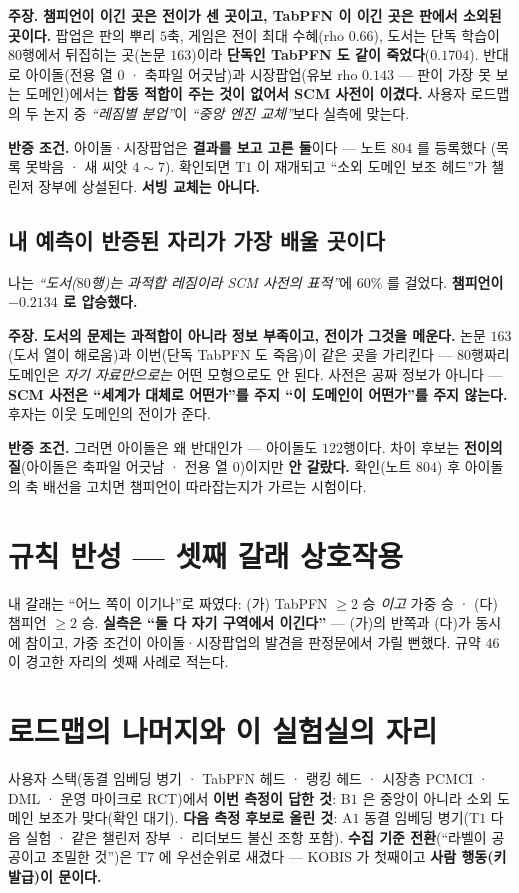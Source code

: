\documentclass[10pt,a4paper]{article}
\newcommand{\claim}[2]{\begin{claimbox}\textbf{주장.} #1\par\smallskip
  \textcolor{gray!70}{\textbf{반증 조건.} #2}\end{claimbox}}
\begin{document}
\claim{\textbf{챔피언이 이긴 곳은 전이가 센 곳이고, TabPFN 이 이긴 곳은 판에서
소외된 곳이다.} 팝업은 판의 뿌리 $5$축, 게임은 전이 최대 수혜(rho $0.66$), 도서는
단독 학습이 $80$행에서 뒤집히는 곳(논문 $163$)이라 \textbf{단독인 TabPFN 도 같이
죽었다}($0.1704$). 반대로 아이돌(전용 열 $0$ · 축파일 어긋남)과 시장팝업(유보
rho $0.143$ --- 판이 가장 못 보는 도메인)에서는 \textbf{합동 적합이 주는 것이
없어서 SCM 사전이 이겼다.} 사용자 로드맵의 두 논지 중 \emph{``레짐별 분업''}이
\emph{``중앙 엔진 교체''}보다 실측에 맞는다.}
{아이돌·시장팝업은 \textbf{결과를 보고 고른 둘}이다 --- 노트 $804$ 를 등록했다
(목록 못박음 · 새 씨앗 $4{\sim}7$). 확인되면 T$1$ 이 재개되고 ``소외 도메인 보조
헤드''가 챌린저 장부에 상설된다. \textbf{서빙 교체는 아니다.}}

\subsection*{내 예측이 반증된 자리가 가장 배울 곳이다}

나는 \emph{``도서($80$행)는 과적합 레짐이라 SCM 사전의 표적''}에 $60\%$ 를 걸었다.
\textbf{챔피언이 $-0.2134$ 로 압승했다.}

\claim{\textbf{도서의 문제는 과적합이 아니라 정보 부족이고, 전이가 그것을 메운다.}
논문 $163$(도서 열이 해로움)과 이번(단독 TabPFN 도 죽음)이 같은 곳을 가리킨다 ---
$80$행짜리 도메인은 \emph{자기 자료만으로는} 어떤 모형으로도 안 된다. 사전은
공짜 정보가 아니다 --- \textbf{SCM 사전은 ``세계가 대체로 어떤가''를 주지 ``이
도메인이 어떤가''를 주지 않는다.} 후자는 이웃 도메인의 전이가 준다.}
{그러면 아이돌은 왜 반대인가 --- 아이돌도 $122$행이다. 차이 후보는 \textbf{전이의
질}(아이돌은 축파일 어긋남 · 전용 열 $0$)이지만 \textbf{안 갈랐다.} 확인(노트
$804$) 후 아이돌의 축 배선을 고치면 챔피언이 따라잡는지가 가르는 시험이다.}

\section{규칙 반성 --- 셋째 갈래 상호작용}

내 갈래는 ``어느 쪽이 이기나''로 짜였다: (가) TabPFN $\geq 2$ 승 \emph{이고}
가중 승 · (다) 챔피언 $\geq 2$ 승. \textbf{실측은 ``둘 다 자기 구역에서 이긴다''}
--- (가)의 반쪽과 (다)가 동시에 참이고, 가중 조건이 아이돌·시장팝업의 발견을
판정문에서 가릴 뻔했다. 규약 $46$ 이 경고한 자리의 셋째 사례로 적는다.

\section{로드맵의 나머지와 이 실험실의 자리}

사용자 스택(동결 임베딩 병기 · TabPFN 헤드 · 랭킹 헤드 · 시장층 PCMCI · DML ·
운영 마이크로 RCT)에서 \textbf{이번 측정이 답한 것}: B$1$ 은 중앙이 아니라 소외
도메인 보조가 맞다(확인 대기). \textbf{다음 측정 후보로 올린 것}: A$1$ 동결 임베딩
병기(T$1$ 다음 실험 · 같은 챌린저 장부 · 리더보드 불신 조항 포함). \textbf{수집
기준 전환}(``라벨이 공공이고 조밀한 것'')은 T$7$ 에 우선순위로 새겼다 --- KOBIS
가 첫째이고 \textbf{사람 행동(키 발급)이 문이다.}
\end{document}
